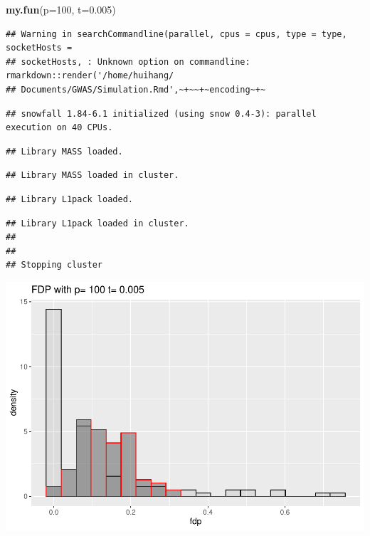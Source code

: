 \documentclass[]{article}
\newenvironment{Shaded}{\begin{snugshade}}{\end{snugshade}}
\newcommand{\DataTypeTok}[1]{\textcolor[rgb]{0.13,0.29,0.53}{#1}}
\newcommand{\DecValTok}[1]{\textcolor[rgb]{0.00,0.00,0.81}{#1}}
\newcommand{\FloatTok}[1]{\textcolor[rgb]{0.00,0.00,0.81}{#1}}
\newcommand{\KeywordTok}[1]{\textcolor[rgb]{0.13,0.29,0.53}{\textbf{#1}}}
\newcommand{\NormalTok}[1]{#1}
\begin{document}
\begin{Shaded}
\begin{Highlighting}[]
\KeywordTok{my.fun}\NormalTok{(}\DataTypeTok{p=}\DecValTok{100}\NormalTok{, }\DataTypeTok{t=}\FloatTok{0.005}\NormalTok{)}
\end{Highlighting}
\end{Shaded}

\begin{verbatim}
## Warning in searchCommandline(parallel, cpus = cpus, type = type, socketHosts =
## socketHosts, : Unknown option on commandline: rmarkdown::render('/home/huihang/
## Documents/GWAS/Simulation.Rmd',~+~~+~encoding~+~
\end{verbatim}

\begin{verbatim}
## snowfall 1.84-6.1 initialized (using snow 0.4-3): parallel execution on 40 CPUs.
\end{verbatim}

\begin{verbatim}
## Library MASS loaded.
\end{verbatim}

\begin{verbatim}
## Library MASS loaded in cluster.
\end{verbatim}

\begin{verbatim}
## Library L1pack loaded.
\end{verbatim}

\begin{verbatim}
## Library L1pack loaded in cluster.
## 
## 
## Stopping cluster
\end{verbatim}

\includegraphics{Simulation_files/figure-latex/unnamed-chunk-1-3.pdf}
\end{document}
